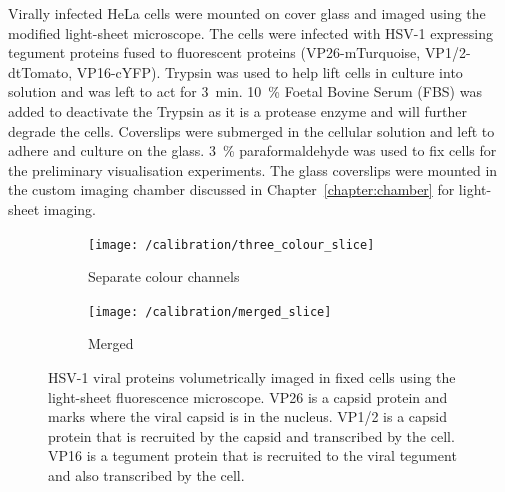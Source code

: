 Virally infected HeLa cells were mounted on cover glass and imaged using the modified light-sheet microscope.
The cells were infected with HSV-1 expressing tegument proteins fused to fluorescent proteins (\gls{VP26}-mTurquoise, \gls{VP1/2}-dtTomato, \gls{VP16}-cYFP).
Trypsin was used to help lift cells in culture into solution and was left to act for \SI{3}{\minute}.
\SI{10}{\percent} Foetal Bovine Serum (FBS) was added to deactivate the Trypsin as it is a protease enzyme and will further degrade the cells.
Coverslips were submerged in the cellular solution and left to adhere and culture on the glass.
\SI{3}{\percent} paraformaldehyde was used to fix cells for the preliminary visualisation experiments.
The glass coverslips were mounted in the custom imaging chamber discussed in Chapter~\ref{chapter:chamber} for light-sheet imaging.


\begin{figure}
	\centering
	\begin{subfigure}[b]{0.7\linewidth}
    \centering
    \texttt{[image: /calibration/three\_colour\_slice]}
    \caption{Separate colour channels}\label{fig:merged_slice}
	\end{subfigure}
	\begin{subfigure}[b]{0.25\linewidth}
    \centering
    \texttt{[image: /calibration/merged\_slice]}
    \caption{Merged}\label{fig:three_colour_slice}
	\end{subfigure}
	\caption{
    \gls{HSV}-1 viral proteins volumetrically imaged in fixed cells using the light-sheet fluorescence microscope.
    \gls{VP26} is a capsid protein and marks where the viral capsid is in the nucleus.
    \gls{VP1/2} is a capsid protein that is recruited by the capsid and transcribed by the cell.
    \gls{VP16} is a tegument protein that is recruited to the viral tegument and also transcribed by the cell.
    }\label{fig:virus_image}
\end{figure}

